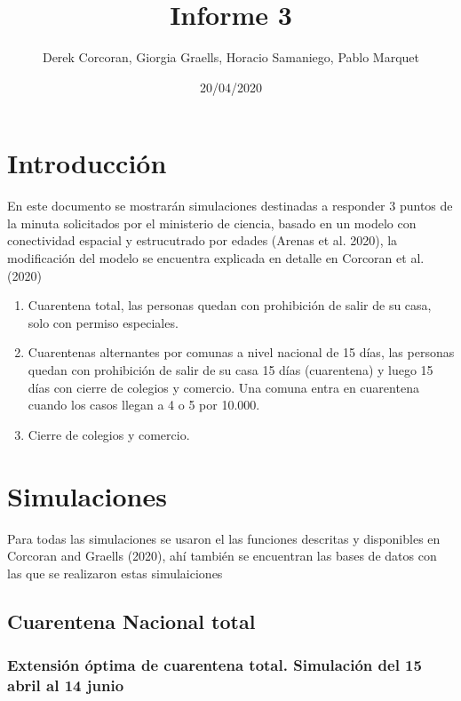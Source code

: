 \documentclass[]{article}
\title{Informe 3}
\author{Derek Corcoran, Giorgia Graells, Horacio Samaniego, Pablo Marquet}
\date{20/04/2020}
\begin{document}
\maketitle

\hypertarget{introducciuxf3n}{%
\section{Introducción}\label{introducciuxf3n}}

En este documento se mostrarán simulaciones destinadas a responder 3 puntos de la minuta solicitados por el ministerio de ciencia, basado en un modelo con conectividad espacial y estrucutrado por edades (Arenas et al. 2020), la modificación del modelo se encuentra explicada en detalle en Corcoran et al. (2020)

\begin{enumerate}
\def\labelenumi{\arabic{enumi}.}
\item
  Cuarentena total, las personas quedan con prohibición de salir de su casa, solo con permiso especiales.
\item
  Cuarentenas alternantes por comunas a nivel nacional de 15 días, las personas quedan con prohibición de salir de su casa 15 días (cuarentena) y luego 15 días con cierre de colegios y comercio. Una comuna entra en cuarentena cuando los casos llegan a 4 o 5 por 10.000.
\item
  Cierre de colegios y comercio.
\end{enumerate}

\hypertarget{simulaciones}{%
\section{Simulaciones}\label{simulaciones}}

Para todas las simulaciones se usaron el las funciones descritas y disponibles en Corcoran and Graells (2020), ahí también se encuentran las bases de datos con las que se realizaron estas simulaiciones

\hypertarget{cuarentena-nacional-total}{%
\subsection{Cuarentena Nacional total}\label{cuarentena-nacional-total}}

\hypertarget{extensiuxf3n-uxf3ptima-de-cuarentena-total.-simulaciuxf3n-del-15-abril-al-14-junio}{%
\subsubsection{Extensión óptima de cuarentena total. Simulación del 15 abril al 14 junio}\label{extensiuxf3n-uxf3ptima-de-cuarentena-total.-simulaciuxf3n-del-15-abril-al-14-junio}}
\end{document}

